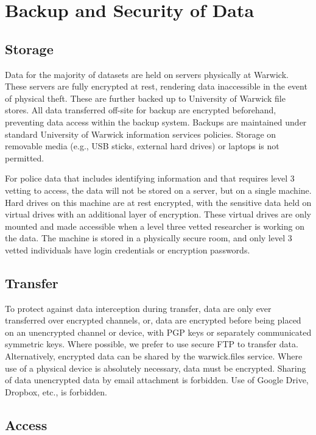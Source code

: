 \documentclass[doc]{apa6}
\begin{document}
\section{Backup and Security of Data}

\subsection{Storage}

Data for the majority of datasets are held on servers physically at Warwick. These servers are fully encrypted at rest, rendering data inaccessible in the event of physical theft. These are further backed up to University of Warwick file stores. All data transferred off-site for backup are encrypted beforehand, preventing data access within the backup system. Backups are maintained under standard University of Warwick information services policies. Storage on removable media (e.g., USB sticks, external hard drives) or laptops is not permitted. 

For police data that includes identifying information and that requires level 3 vetting to access, the data will not be stored on a server, but on a single machine. Hard drives on this machine are at rest encrypted, with the sensitive data held on virtual drives with an additional layer of encryption. These virtual drives are only mounted and made accessible when a level three vetted researcher is working on the data. The machine is stored in a physically secure room, and only level 3 vetted individuals have login credentials or encryption passwords. 

\subsection{Transfer}

To protect against data interception during transfer, data are only ever transferred over encrypted channels, or, data are encrypted before being placed on an unencrypted channel or device, with PGP keys or separately communicated symmetric keys. Where possible, we prefer to use secure FTP to transfer data. Alternatively, encrypted data can be shared by the warwick.files service. Where use of a physical device is absolutely necessary, data must be encrypted. Sharing of data unencrypted data by email attachment is forbidden. Use of Google Drive, Dropbox, etc., is forbidden.

\subsection{Access}
\end{document}
